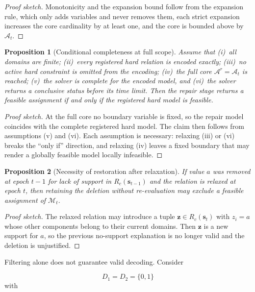 \documentclass[pdflatex,sn-mathphys-num,iicol,oneside]{sn-jnl}
\newtheorem{proposition}{Proposition}
\begin{document}
\begin{proof}[Proof sketch]
Monotonicity and the expansion bound follow from the expansion rule,
which only adds variables and never removes them, each strict
expansion increases the core cardinality by at least one, and the
core is bounded above by $\mathcal{A}_t$.
\end{proof}

\begin{proposition}[Conditional completeness at full scope]
\label{prop:completeness}
Assume that
(i)~all domains are finite;
(ii)~every registered hard relation is encoded exactly;
(iii)~no active hard constraint is omitted from the encoding;
(iv)~the full core $\mathcal{A}^{r}=\mathcal{A}_t$ is reached;
(v)~the solver is complete for the encoded model, and
(vi)~the solver returns a conclusive status before its time limit.
Then the repair stage returns a feasible assignment if and only if
the registered hard model is feasible.
\end{proposition}

\begin{proof}[Proof sketch]
At the full core no boundary variable is fixed, so the repair model
coincides with the complete registered hard model. The claim then
follows from assumptions (v) and (vi). Each assumption is necessary:
relaxing (iii) or (vi) breaks the ``only if'' direction, and relaxing
(iv) leaves a fixed boundary that may render a globally feasible
model locally infeasible.
\end{proof}

\begin{proposition}[Necessity of restoration after relaxation]
\label{prop:restoration}
If value $a$ was removed at epoch $t-1$ for lack of support in
$R_c(\bm{s}_{t-1})$ and the relation is relaxed at epoch $t$, then
retaining the deletion without re-evaluation may exclude a feasible
assignment of $\mathcal{M}_t$.
\end{proposition}

\begin{proof}[Proof sketch]
The relaxed relation may introduce a tuple
$\bm{z}\in R_c(\bm{s}_t)$ with $z_i=a$ whose other components belong
to their current domains. Then $\bm{z}$ is a new support for $a$, so
the previous no-support explanation is no longer valid and the
deletion is unjustified.
\end{proof}

Filtering alone does not guarantee valid decoding. Consider

\[
D_1=D_2=\{0,1\}
\]
with
\end{document}

